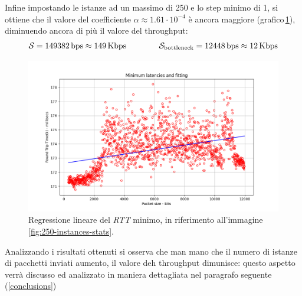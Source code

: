 \FloatBarrier\noindent Infine impostando le istanze ad un massimo di 250 e lo step minimo di 1, si ottiene che il valore del coefficiente $\alpha \approx 1.61 \cdot 10^{-4}$ è ancora maggiore (grafico\,\ref{fig:250-instances-min}), diminuendo ancora di più il valore del throughput:
\begin{gather*}
    \mathcal{S} = 149382\,\text{bps} \approx  149\,\text{Kbps}  \hspace{40px} \mathcal{S}_{\text{bottleneck}} = 12448\,\text{bps} \approx  12\,\text{Kbps}
\end{gather*}

\begin{figure}[h]
    \centering
    \includegraphics[width = .8\textwidth]{hw-2/report/imgs/250-instances/la-min-latencies.png}
    \caption{Regressione lineare del \textsl{RTT} minimo, in riferimento all'immagine\,\ref{fig:250-instances-stats}.}
    \label{fig:250-instances-min}
\end{figure}

\FloatBarrier\noindent Analizzando i risultati ottenuti si osserva che man mano che il numero di istanze di pacchetti inviati aumento, il valore deh throughput dimunisce: questo aspetto verrà discusso ed analizzato in maniera dettagliata nel paragrafo seguente (\ref{conclusions})

